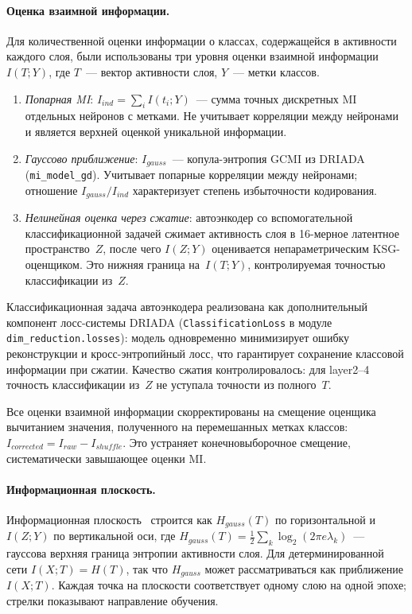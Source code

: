 \paragraph{Оценка взаимной информации.}
Для количественной оценки информации о классах, содержащейся в активности каждого слоя, были использованы три уровня оценки взаимной информации $I(T; Y)$, где $T$~--- вектор активности слоя, $Y$~--- метки классов.

\begin{enumerate}
    \item \textit{Попарная MI}: $I_{ind} = \sum_i I(t_i; Y)$~--- сумма точных дискретных MI отдельных нейронов с метками. Не учитывает корреляции между нейронами и является верхней оценкой уникальной информации.
    \item \textit{Гауссово приближение}: $I_{gauss}$~--- копула-энтропия GCMI из DRIADA (\texttt{mi\_model\_gd}). Учитывает попарные корреляции между нейронами; отношение $I_{gauss}/I_{ind}$ характеризует степень избыточности кодирования.
    \item \textit{Нелинейная оценка через сжатие}: автоэнкодер со вспомогательной классификационной задачей сжимает активность слоя в 16-мерное латентное пространство~$Z$, после чего $I(Z; Y)$ оценивается непараметрическим KSG-оценщиком. Это нижняя граница на~$I(T; Y)$, контролируемая точностью классификации из~$Z$.
\end{enumerate}

Классификационная задача автоэнкодера реализована как дополнительный компонент лосс-системы DRIADA (\texttt{ClassificationLoss} в модуле \texttt{dim\_reduction.losses}): модель одновременно минимизирует ошибку реконструкции и кросс-энтропийный лосс, что гарантирует сохранение классовой информации при сжатии. Качество сжатия контролировалось: для layer2--4 точность классификации из~$Z$ не уступала точности из полного~$T$.

Все оценки взаимной информации скорректированы на смещение оценщика вычитанием значения, полученного на перемешанных метках классов: $I_{corrected} = I_{raw} - I_{shuffle}$. Это устраняет конечновыборочное смещение, систематически завышающее оценки MI.

\paragraph{Информационная плоскость.}
Информационная плоскость~\cite{ShwartzZiv2017} строится как $H_{gauss}(T)$ по горизонтальной и $I(Z; Y)$ по вертикальной оси, где $H_{gauss}(T) = \frac{1}{2}\sum_k \log_2(2\pi e \lambda_k)$~--- гауссова верхняя граница энтропии активности слоя. Для детерминированной сети $I(X; T) = H(T)$, так что $H_{gauss}$ может рассматриваться как приближение $I(X; T)$. Каждая точка на плоскости соответствует одному слою на одной эпохе; стрелки показывают направление обучения.

